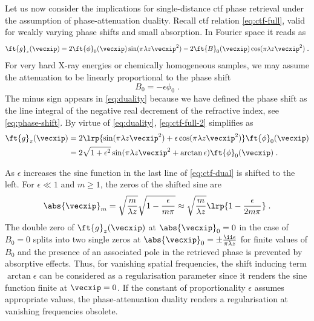 \documentclass[
twoside,
openright,
titlepage,
numbers=noenddot,
headinclude,
fleqn,
a4paper,
footinclude=true,
cleardoublepage=empty,
abstractoff,
BCOR=5mm,
paper=a4,
fontsize=11pt,
british,ngerman,american,
]{scrreprt}
\begin{document}
Let us now consider the implications for single-distance \ac{ctf}
phase retrieval under the assumption of phase-attenuation duality.
Recall \ac{ctf} relation \eqref{eq:ctf-full}, valid for weakly varying
phase shifts and small absorption.  In Fourier space it reads as
\begin{equation}
  \label{eq:ctf-full-2}
  \begin{split}
    \ft{g}_z(\vecxip) = 
    2\ft{\phi}_0(\vecxip)\sin(\pi\lambda z\vecxip^2)
    -2\ft{B}_0(\vecxip)\cos(\pi\lambda z\vecxip^2) \;.
  \end{split}
\end{equation}
For very hard X-ray energies or chemically homogeneous samples, we may
assume the attenuation to be linearly proportional to the phase shift
\begin{equation}
  \label{eq:duality} 
  B_0 = - \epsilon \phi_0 \;.
\end{equation}
The minus sign appears in \cref{eq:duality} because we have defined
the phase shift as the line integral of the negative real decrement of
the refractive index, see \cref{eq:phase-shift}.  By virtue of
\cref{eq:duality}, \cref{eq:ctf-full-2} simplifies as
\begin{equation}
  \label{eq:ctf-dual} 
  \begin{split}
    \ft{g}_z(\vecxip) & = 2 \lrp{ 
      \sin(\pi\lambda z\vecxip^2) 
      + \epsilon\cos(\pi\lambda z\vecxip^2) } 
    \ft{\phi}_0(\vecxip)
    \\ & = 2 \sqrt{1+\epsilon^2}
    \sin(\pi\lambda z\vecxip^2+\arctan\epsilon) 
    \ft{\phi}_0(\vecxip) \;.
  \end{split}
\end{equation}

As $\epsilon$ increases the sine function in the last line of
\cref{eq:ctf-dual} is shifted to the left.  For $\epsilon\ll 1$ and
$m\ge1$, the zeros of the shifted sine are
\begin{equation}
  \label{eq:sine-zeros-shifted}
  \abs{\vecxip}_m = \sqrt{\frac{m}{\lambda z}}
  \sqrt{1-\frac{\epsilon}{m\pi}}
  \approx \sqrt{\frac{m}{\lambda z}}\lrp{1-\frac{\epsilon}{2m\pi}} \;.
\end{equation}
The double zero of $\ft{g}_z(\vecxip)$ at $\abs{\vecxip}_0=0$ in the
case of $B_0=0$ splits into two single zeros at
$\abs{\vecxip}_0=\pm\frac{\ii\epsilon}{\pi\lambda z}$ for finite
values of $B_0$ and the presence of an associated pole in the
retrieved phase is prevented by absorptive effects.  Thus, for
vanishing spatial frequencies, the shift inducing term
$\arctan\epsilon$ can be considered as a regularisation parameter
since it renders the sine function finite at $\vecxip=0$.  If the
constant of proportionality $\epsilon$ assumes appropriate values,
the phase-attenuation duality renders a regularisation at vanishing
frequencies obsolete.
\end{document}
